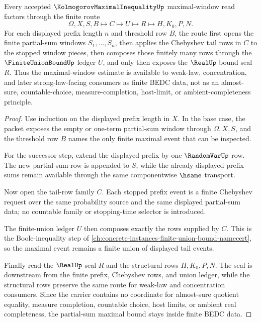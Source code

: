 \begin{theorem}
\label{thm:kolmogorov-maximal-inequality-partial-sum-window-bound}
Every accepted $\KolmogorovMaximalInequalityUp$ maximal-window read factors through the finite route
$$
\Omega,X,S,B \longmapsto C \longmapsto U \longmapsto R \longmapsto H,K_0,P,N .
$$
For each displayed prefix length $n$ and threshold row $B$, the route first opens the finite partial-sum windows $S_1,\ldots,S_n$, then applies the Chebyshev tail rows in $C$ to the stopped window pieces, then composes those finitely many rows through the $\FiniteUnionBoundUp$ ledger $U$, and only then exposes the $\RealUp$ bound seal $R$. Thus the maximal-window estimate is available to weak-law, concentration, and later strong-law-facing consumers as finite BEDC data, not as an almost-sure, countable-choice, measure-completion, host-limit, or ambient-completeness principle.
\end{theorem}
\begin{proof}
Use induction on the displayed prefix length in $X$. In the base case, the packet exposes the empty or one-term partial-sum window through $\Omega,X,S$, and the threshold row $B$ names the only finite maximal event that can be inspected.

For the successor step, extend the displayed prefix by one $\RandomVarUp$ row. The new partial-sum row is appended to $S$, while the already displayed prefix sums remain available through the same componentwise $\hsame$ transport.

Now open the tail-row family $C$. Each stopped prefix event is a finite Chebyshev request over the same probability source and the same displayed partial-sum data; no countable family or stopping-time selector is introduced.

The finite-union ledger $U$ then composes exactly the rows supplied by $C$. This is the Boole-inequality step of \autoref{ch:concrete-instances-finite-union-bound-namecert}, so the maximal event remains a finite union of displayed tail events.

Finally read the $\RealUp$ seal $R$ and the structural rows $H,K_0,P,N$. The seal is downstream from the finite prefix, Chebyshev rows, and union ledger, while the structural rows preserve the same route for weak-law and concentration consumers. Since the carrier contains no coordinate for almost-sure quotient equality, measure completion, countable choice, host limits, or ambient real completeness, the partial-sum maximal bound stays inside finite BEDC data.
\end{proof}

